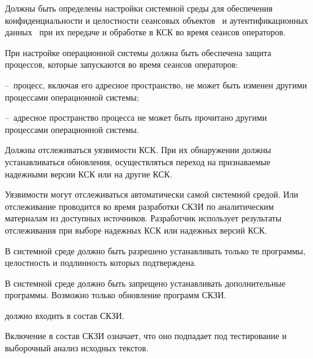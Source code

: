 \label{R.ES.Session}
Должны быть определены настройки системной среды
для обеспечения конфиденциальности и целостности сеансовых 
объектов~ и аутентификационных 
данных~ при их передаче и  
обработке в КСК во время сеансов операторов.

\begin{note}
При настройке операционной системы должна быть обеспечена защита 
процессов, которые запускаются во время сеансов операторов:

--~процесс, включая его адресное пространство, не может быть 
изменен другими процессами операционной системы;

--~адресное пространство процесса не может быть прочитано другими процессами 
операционной системы.
\end{note}

\label{R.ES.CVE}
Должны отслеживаться уязвимости КСК. При их обнаружении должны 
устанавливаться обновления, осуществляться переход на признаваемые надежными
версии КСК или на другие КСК.

\begin{note}
Уязвимости могут отслеживаться автоматически самой системной средой.
Или отслеживание проводится во время разработки СКЗИ по аналитическим
материалам из доступных источников. Разработчик использует результаты
отслеживания при выборе надежных КСК или надежных версий КСК.
\end{note}

\label{R.ES.AuthCode}
В системной среде должно быть разрешено устанавливать только те программы,
целостность и подлинность которых подтверждена.


\label{R.ES.NoCode}
В системной среде должно быть запрещено устанавливать дополнительные программы.
Возможно только обновление программ СКЗИ.

\label{R.ES.OS}
 должно входить в состав СКЗИ.


\begin{note}
Включение  в состав СКЗИ означает, что оно 
подпадает под тестирование и выборочный анализ исходных текстов. 
%
\end{note}


